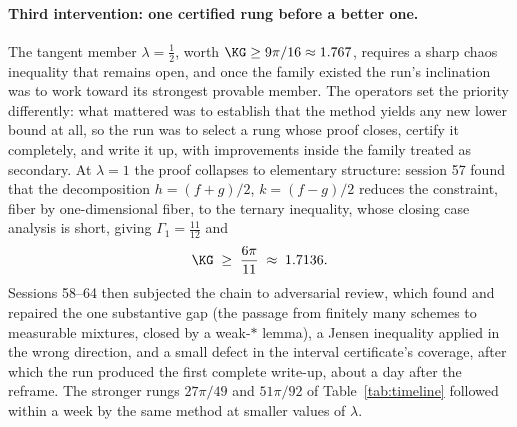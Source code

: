 \paragraph{Third intervention: one certified rung before a better one.}
The tangent member $\lambda=\tfrac12$, worth $\KG\ge9\pi/16\approx1.767$,
requires a sharp chaos inequality that remains open, and once the family
existed the run's inclination was to work toward its strongest provable
member. The operators set the priority differently: what mattered was to
establish that the method yields any new lower bound at all, so the run was
to select a rung whose proof closes, certify it completely, and write it up,
with improvements inside the family treated as secondary. At $\lambda=1$ the
proof collapses to elementary structure: session 57 found that the
decomposition $h=(f+g)/2$, $k=(f-g)/2$ reduces the constraint, fiber by
one-dimensional fiber, to the ternary inequality,
whose closing case analysis is short, giving $\Gamma_1=\tfrac{11}{12}$ and
\[
        \KG\;\ge\;\frac{6\pi}{11}\;\approx\;1.7136 .
\]
Sessions 58--64 then subjected the chain to adversarial review, which
found and repaired the one substantive gap (the passage from finitely many
schemes to measurable mixtures, closed by a weak-$*$ lemma), a Jensen
inequality applied in the wrong direction, and a small defect in the
interval certificate's coverage, after which the run produced the first
complete write-up, about a day after the reframe. The stronger rungs
$27\pi/49$ and $51\pi/92$ of Table~\ref{tab:timeline} followed within a week
by the same method at smaller values of $\lambda$.

